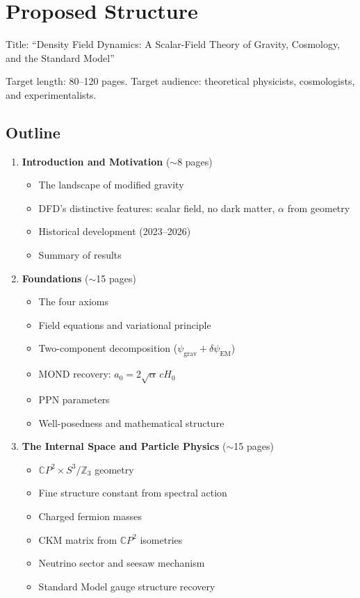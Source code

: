 \documentclass[11pt,a4paper]{article}
\newcommand{\CP}{\mathbb{C}P}
\begin{document}
\section{Proposed Structure}

Title: ``Density Field Dynamics: A Scalar-Field Theory of Gravity, Cosmology, and the Standard Model''

Target length: 80--120 pages. Target audience: theoretical physicists, cosmologists, and experimentalists.

\subsection{Outline}

\begin{enumerate}[label=\Roman*.]
\item \textbf{Introduction and Motivation} ($\sim$8 pages)
\begin{itemize}
\item The landscape of modified gravity
\item DFD's distinctive features: scalar field, no dark matter, $\alpha$ from geometry
\item Historical development (2023--2026)
\item Summary of results
\end{itemize}

\item \textbf{Foundations} ($\sim$15 pages)
\begin{itemize}
\item The four axioms
\item Field equations and variational principle
\item Two-component decomposition ($\psi_{\mathrm{grav}} + \delta\psi_{\mathrm{EM}}$)
\item MOND recovery: $a_0 = 2\sqrt{\alpha}\,cH_0$
\item PPN parameters
\item Well-posedness and mathematical structure
\end{itemize}

\item \textbf{The Internal Space and Particle Physics} ($\sim$15 pages)
\begin{itemize}
\item $\CP^2 \times S^3/\mathbb{Z}_3$ geometry
\item Fine structure constant from spectral action
\item Charged fermion masses
\item CKM matrix from $\CP^2$ isometries
\item Neutrino sector and seesaw mechanism
\item Standard Model gauge structure recovery
\end{itemize}


\end{enumerate}
\end{document}
